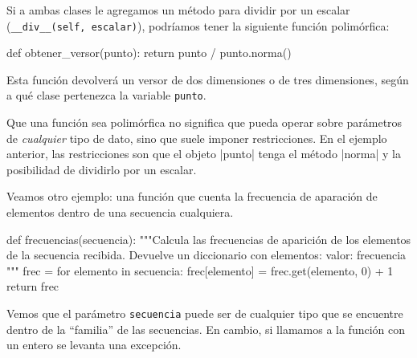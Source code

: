 Si a ambas clases le agregamos un método para dividir por un escalar
(\lstinline!__div__(self, escalar)!), podríamos tener la siguiente función
polimórfica:

\begin{codigo-python-sn}
def obtener_versor(punto):
    return punto / punto.norma()
\end{codigo-python-sn}

Esta función devolverá un versor de dos dimensiones o de tres dimensiones,
según a qué clase pertenezca la variable \lstinline!punto!.

\begin{atencion}
Que una función sea polimórfica no significa que pueda operar sobre parámetros
de \emph{cualquier} tipo de dato, sino que suele imponer restricciones.  En el
ejemplo anterior, las restricciones son que el objeto |punto| tenga el método
|norma| y la posibilidad de dividirlo por un escalar.
\end{atencion}

Veamos otro ejemplo: una función que cuenta la frecuencia de aparación de
elementos dentro de una secuencia cualquiera.

\begin{codigo-python-sn}
def frecuencias(secuencia):
    """Calcula las frecuencias de aparición de los elementos de
       la secuencia recibida.
       Devuelve un diccionario con elementos: {valor: frecuencia}
    """
    frec = {}
    for elemento in secuencia:
        frec[elemento] = frec.get(elemento, 0) + 1
    return frec
\end{codigo-python-sn}

Vemos que el parámetro \lstinline!secuencia! puede ser de cualquier tipo
que se encuentre dentro de la ``familia'' de las secuencias. En cambio, si
llamamos a la función con un entero se levanta una excepción.


